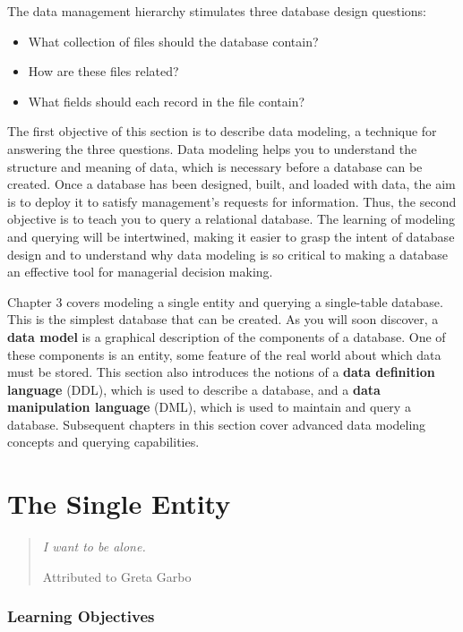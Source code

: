 \documentclass[
]{article}
\begin{document}
The data management hierarchy stimulates three database design
questions:

\begin{itemize}
\item
  What collection of files should the database contain?
\item
  How are these files related?
\item
  What fields should each record in the file contain?
\end{itemize}

The first objective of this section is to describe data modeling, a
technique for answering the three questions. Data modeling helps you to
understand the structure and meaning of data, which is necessary before
a database can be created. Once a database has been designed, built, and
loaded with data, the aim is to deploy it to satisfy management's
requests for information. Thus, the second objective is to teach you to
query a relational database. The learning of modeling and querying will
be intertwined, making it easier to grasp the intent of database design
and to understand why data modeling is so critical to making a database
an effective tool for managerial decision making.

Chapter 3 covers modeling a single entity and querying a single-table
database. This is the simplest database that can be created. As you will
soon discover, a \textbf{data model} is a graphical description of the
components of a database. One of these components is an entity, some
feature of the real world about which data must be stored. This section
also introduces the notions of a \textbf{data definition language} (DDL),
which is used to describe a database, and a \textbf{data manipulation
language} (DML), which is used to maintain and query a database.
Subsequent chapters in this section cover advanced data modeling
concepts and querying capabilities.

\hypertarget{the-single-entity}{%
\section{The Single Entity}\label{the-single-entity}}

\begin{quote}
\emph{I want to be alone.}

Attributed to Greta Garbo
\end{quote}

\hypertarget{learning-objectives-2}{%
\subsubsection*{Learning Objectives}\label{learning-objectives-2}}
\end{document}
